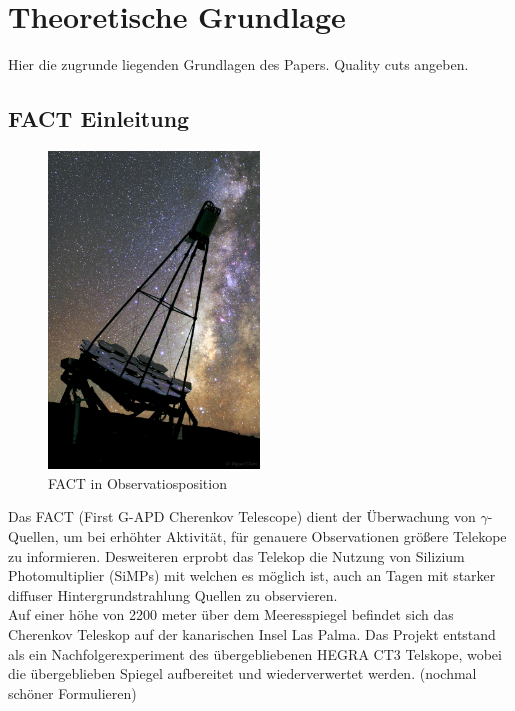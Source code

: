 \chapter{Theoretische Grundlage}
Hier die zugrunde liegenden Grundlagen des Papers.
Quality cuts angeben.

\section{FACT Einleitung}
\begin{figure}
  \includegraphics[width=0.5\textwidth]{./logos/FACT.jpg}
  \caption{FACT in Observatiosposition}
  \label{fig:observ}
\end{figure}
Das FACT (First G-APD Cherenkov Telescope) dient der Überwachung von $\gamma$-Quellen, um bei erhöhter Aktivität, für genauere Observationen größere Telekope zu informieren. Desweiteren erprobt das Telekop die Nutzung von Silizium Photomultiplier (SiMPs) mit welchen es möglich ist, auch an Tagen mit starker diffuser Hintergrundstrahlung Quellen zu observieren. \\

Auf einer höhe von 2200 meter über dem Meeresspiegel befindet sich das Cherenkov Teleskop auf der kanarischen Insel Las Palma. Das Projekt entstand als ein Nachfolgerexperiment des übergebliebenen HEGRA CT3 Telskope, wobei die übergeblieben Spiegel aufbereitet und wiederverwertet werden. (nochmal schöner Formulieren)\\

